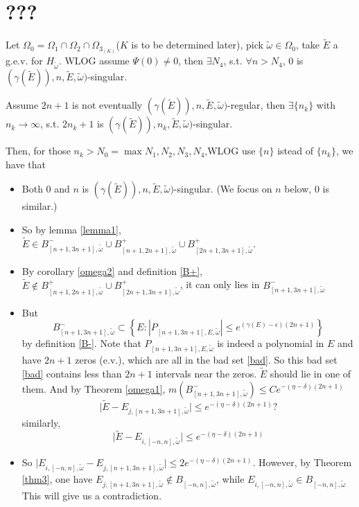 \section{???}
Let $\Omega_0=\Omega_1\cap\Omega_2\cap\Omega_3_(K)$($K$ is to be determined later), pick $\tilde{\omega}\in\Omega_0$, take $\tilde{E}$ a g.e.v. for $H_{\tilde{\omega}}$.
WLOG assume $\Psi(0)\neq 0$, then $\exists N_4$, s.t. $\forall n>N_4$, 0 is $(\gamma(\tilde{E})),n,\tilde{E},\tilde{\omega})$-singular.

Assume $2n+1$ is not eventually $(\gamma(\tilde{E})),n,\tilde{E},\tilde{\omega})$-regular, then $\exists \{n_k\}$ with $n_k\to\infty$, s.t. $2n_k+1$ is  $(\gamma(\tilde{E})),n_k,\tilde{E},\tilde{\omega})$-singular.

Then, for those $n_k>N_0=\max{N_1,N_2,N_3,N_4}$,WLOG use $\{n\}$ istead of $\{n_k\}$, we have that
\begin{itemize}
  \item Both $0$ and $n$ is $(\gamma(\tilde{E})),n,\tilde{E},\tilde{\omega})$-singular. (We focus on $n$ below, $0$ is similar.)
  \item So by lemma \ref{lemma1},  $\tilde{E}\in B_{[n+1,3n+1],\tilde{\omega}}^-\cup B_{[n+1,2n+1],\tilde{\omega}}^+\cup B_{[2n+1,3n+1],\tilde{\omega}}^+$.
  \item By corollary \ref{omega2} and definition \ref{B+}, $\tilde{E}\notin B_{[n+1,2n+1],\tilde{\omega}}^+\cup B_{[2n+1,3n+1],\tilde{\omega}}^+$, it can only lies in $B_{[n+1,3n+1],\tilde{\omega}}^-$
  \item But
  \begin{equation}\label{bad}
    B_{[n+1,3n+1],\tilde{\omega}}^-\subset \left\{E:|P_{[n+1,3n+1],E,\tilde{\omega}}|\leq e^{(\gamma(E)-\epsilon)(2n+1)}\right\}
  \end{equation}
  by definition \ref{B-}.
   Note that $P_{[n+1,3n+1],E,\tilde{\omega}}$ is indeed a polynomial in $E$ and have $2n+1$ zeros (e.v.), which are all in the bad set \eqref{bad}. So this bad set \eqref{bad} contains less than $2n+1$ intervals near the zeros. $\tilde{E}$ should lie in one of them. And by Theorem \ref{omega1}, $m(B_{[n+1,3n+1],\tilde{\omega}}^-)\leq Ce^{-(\eta-\delta)(2n+1)}$
   \[
   \vert\tilde{E}-E_{j,[n+1,3n+1],\tilde{\omega}}\vert\leq e^{-(\eta-\delta)(2n+1)}?
   \]
   similarly,
   \[
   \vert\tilde{E}-E_{i,[-n,n],\tilde{\omega}}\vert\leq e^{-(\eta-\delta)(2n+1)}
   \]
   \item So $\vert E_{i,[-n,n],\tilde{\omega}}-E_{j,[n+1,3n+1],\tilde{\omega}}\vert\leq 2e^{-(\eta-\delta)(2n+1)}$. However, by Theorem \ref{thm3}, one have $E_{j,[n+1,3n+1],\tilde{\omega}}\notin B_{[-n,n],\tilde{\omega}}$, while $E_{i,[-n,n],\tilde{\omega}}\in B_{[-n,n],\tilde{\omega}}$
   This will give us a contradiction.
\end{itemize}

